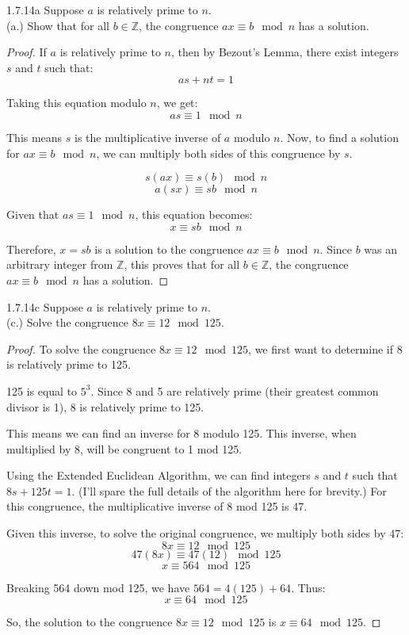 \documentclass[12pt]{amsart}
\theoremstyle{definition}
\numberwithin{equation}{section}
\theoremstyle{plain}
\newcommand{\Z}{\mathbb{Z}}
\begin{document}
\begin{exercise}{1.7.14a}
    Suppose $a$ is relatively prime to $n$.\\
    (a.) Show that for all $b\in \Z$, the congruence $ax \equiv b \mod n$ has a solution.
    \begin{proof}
If \( a \) is relatively prime to \( n \), then by Bezout's Lemma, there exist integers \( s \) and \( t \) such that:
\[ as + nt = 1 \]

Taking this equation modulo \( n \), we get:
\[ as \equiv 1 \mod n \]

This means \( s \) is the multiplicative inverse of \( a \) modulo \( n \). Now, to find a solution for \( ax \equiv b \mod n \), we can multiply both sides of this congruence by \( s \).

\[ s(ax) \equiv s(b) \mod n \]
\[ a(sx) \equiv sb \mod n \]

Given that \( as \equiv 1 \mod n \), this equation becomes:
\[ x \equiv sb \mod n \]

Therefore, \( x = sb \) is a solution to the congruence \( ax \equiv b \mod n \). Since \( b \) was an arbitrary integer from \( \Z \), this proves that for all \( b \in \Z \), the congruence \( ax \equiv b \mod n \) has a solution.
    \end{proof}
\end{exercise}
\begin{exercise}{1.7.14c}
    Suppose $a$ is relatively prime to $n$.\\
    (c.) Solve the congruence $8x \equiv 12 \mod 125$.

    \begin{proof}
        To solve the congruence \( 8x \equiv 12 \mod 125 \), we first want to determine if 8 is relatively prime to 125. 
        
        125 is equal to \( 5^3 \). Since 8 and 5 are relatively prime (their greatest common divisor is 1), 8 is relatively prime to 125.
        
        This means we can find an inverse for 8 modulo 125. This inverse, when multiplied by 8, will be congruent to 1 mod 125.
        
        Using the Extended Euclidean Algorithm, we can find integers \( s \) and \( t \) such that \( 8s + 125t = 1 \). (I'll spare the full details of the algorithm here for brevity.) For this congruence, the multiplicative inverse of 8 mod 125 is 47.
        
        Given this inverse, to solve the original congruence, we multiply both sides by 47:
        \[ 8x \equiv 12 \mod 125 \]
        \[ 47(8x) \equiv 47(12) \mod 125 \]
        \[ x \equiv 564 \mod 125 \]
        
        Breaking 564 down mod 125, we have \( 564 = 4(125) + 64 \). Thus:
        \[ x \equiv 64 \mod 125 \]
        
        So, the solution to the congruence \( 8x \equiv 12 \mod 125 \) is \( x \equiv 64 \mod 125 \).
    \end{proof}
    \end{exercise}
\end{document}
